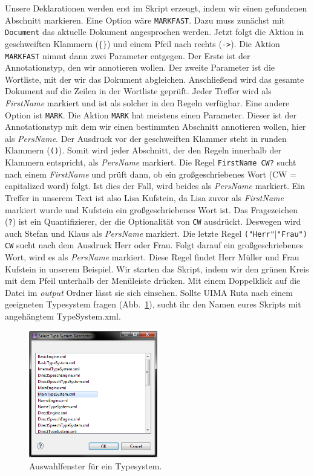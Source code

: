 \documentclass{article}
\begin{document}
Unsere Deklarationen werden erst im Skript erzeugt, indem wir einen gefundenen Abschnitt markieren. Eine Option wäre \texttt{MARKFAST}. Dazu muss zunächst mit \texttt{Document} das aktuelle Dokument angesprochen werden. Jetzt folgt die Aktion in geschweiften Klammern (\texttt{$\{\}$}) und einem Pfeil nach rechts (\texttt{->}). Die Aktion \texttt{MARKFAST} nimmt dann zwei Parameter entgegen. Der Erste ist der Annotationstyp, den wir annotieren wollen. Der zweite Parameter ist die Wortliste, mit der wir das Dokument abgleichen. Anschließend wird das gesamte Dokument auf die Zeilen in der Wortliste geprüft. Jeder Treffer wird als \textit{FirstName} markiert und ist als solcher in den Regeln verfügbar. Eine andere Option ist \texttt{MARK}. Die Aktion \texttt{MARK} hat meistens einen Parameter. Dieser ist der Annotationstyp mit dem wir einen bestimmten Abschnitt annotieren wollen, hier als \textit{PersName}. Der Ausdruck vor der geschweiften Klammer steht in runden Klammern (\texttt{()}). Somit wird jeder Abschnitt, der den Regeln innerhalb der Klammern entspricht, als \textit{PersName} markiert. Die Regel \texttt{FirstName CW?} sucht nach einem \textit{FirstName} und prüft dann, ob ein großgeschriebenes Wort (CW = capitalized word) folgt. Ist dies der Fall, wird beides als \textit{PersName} markiert. Ein Treffer in unserem Text ist also \glqq Lisa Kufstein\grqq{}, da \glqq Lisa\grqq{} zuvor als \textit{FirstName} markiert wurde und \glqq Kufstein\grqq{} ein großgeschriebenes Wort ist. Das Fragezeichen (\texttt{?}) ist ein Quantifizierer, der die Optionalität von \texttt{CW} ausdrückt. Deswegen wird auch \glqq Stefan\grqq{} und \glqq Klaus\grqq{} als \textit{PersName} markiert. Die letzte Regel \texttt{("Herr"$\mid$"Frau") CW} sucht nach dem Ausdruck \glqq Herr\grqq{} oder \glqq Frau\grqq{}. Folgt darauf ein großgeschriebenes Wort, wird es als \textit{PersName} markiert. Diese Regel findet \glqq Herr Müller\grqq{} und \glqq Frau Kufstein\grqq{} in unserem Beispiel. Wir starten das Skript, indem wir den grünen Kreis mit dem Pfeil unterhalb der Menüleiste drücken. Mit einem Doppelklick auf die Datei im \textit{output} Ordner lässt sie sich einsehen. Sollte UIMA Ruta nach einem geeigneten Typesystem fragen (Abb.~\ref{typesystem}), sucht ihr den Namen eures Skripts mit angehängtem \glqq TypeSystem.xml\grqq{}.

\begin{figure}
\centering
\includegraphics[width=0.5\textwidth]{figs/typesystem.png}
\caption{Auswahlfenster für ein Typesystem.}
\label{typesystem}
\end{figure}
\end{document}
